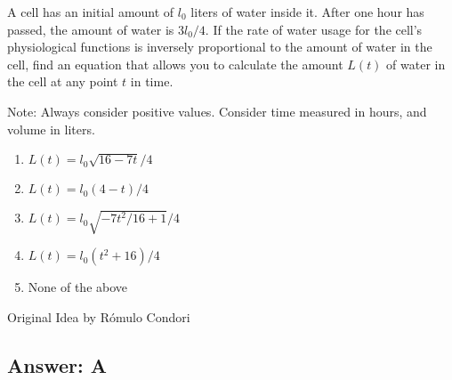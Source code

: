 
A cell has an initial amount of $l_0$ liters of water inside it. After one hour has passed, the amount of water is $3 l_0 / 4$. If the rate of water usage for the cell's physiological functions is inversely proportional to the amount of water in the cell, find an equation that allows you to calculate the amount $L(t)$ of water in the cell at any point $t$ in time.

Note: Always consider positive values. Consider time measured in hours, and volume in liters.

\begin{enumerate}[label={\Alph*.}]
    \item $L(t) = l_0 \sqrt{16 - 7t} / 4$
    \item $L(t) = l_0 (4 - t) / 4$
    \item $L(t) = l_0 \sqrt{-7 t^2/16 + 1} / 4$
    \item $L(t) = l_0 (t^2 + 16) / 4$
    \item None of the above
\end{enumerate}

Original Idea by Rómulo Condori


\subsection*{Answer: A}

